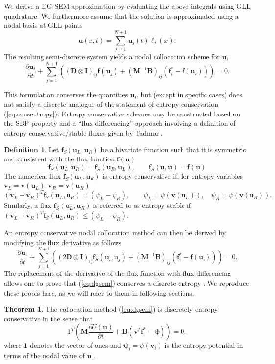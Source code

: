 \documentclass[preprint,10pt]{article}
\theoremstyle{definition}
\newtheorem{definition}{Definition}
\theoremstyle{lemma}
\theoremstyle{theorem}
\newtheorem{theorem}{Theorem}
\theoremstyle{assumption}
\newcommand{\pd}[2]{\frac{\partial#1}{\partial#2}}
\newcommand{\LRp}[1]{\left( #1 \right)}
\begin{document}
We derive a DG-SEM approximation by evaluating the above integrals using GLL quadrature.  We furthermore assume that the solution is approximated using a nodal basis at GLL points 
\[
\bm{u}(x,t) = \sum_{j=1}^{N+1} \bm{u}_j(t)\ell_j(x).  
\]
The resulting semi-discrete system yields a nodal collocation scheme for $\bm{u}_i$ 
\[
\pd{\bm{u}_i}{t} + \sum_{j=1}^{N+1}\LRp{\LRp{\bm{D}\otimes \bm{I}}_{ij}\bm{f}(\bm{u}_j) +\LRp{\bm{M}^{-1}\bm{B}}_{ij}(\bm{f}_i^* - \bm{f}(\bm{u}_i))} = 0.
\]

This formulation conserves the quantities $\bm{u}_i$, but (except in specific cases) does not satisfy a discrete analogue of the statement of entropy conservation (\ref{eq:consentropy}).  Entropy conservative schemes may be constructed based on the SBP property and a ``flux differencing'' approach \cite{gassner2016split} involving a definition of entropy conservative/stable fluxes given by Tadmor \cite{tadmor1987numerical, tadmor2003entropy}.  
\begin{definition}
Let $\bm{f}_S(\bm{u}_L,\bm{u}_R)$ be a bivariate function such that it is symmetric and consistent with the flux function $\bm{f}(\bm{u})$
\[
\bm{f}_S(\bm{u}_L,\bm{u}_R) = \bm{f}_S(\bm{u}_R,\bm{u}_L), \qquad \bm{f}_S(\bm{u},\bm{u}) = \bm{f}(\bm{u})
\]
The numerical flux $\bm{f}_S(\bm{u}_L, \bm{u}_R)$ is entropy conservative if, for entropy variables $\bm{v}_L = \bm{v}(\bm{u}_L), \bm{v}_R = \bm{v}(\bm{u}_R)$
\[
\LRp{\bm{v}_L - \bm{v}_R}^T \bm{f}_S(\bm{u}_L,\bm{u}_R) = (\psi_L - \psi_R), \qquad \psi_L = \psi(\bm{v}(\bm{u}_L)), \quad \psi_R = \psi(\bm{v}(\bm{u}_R)).  
\]
Similarly, a flux $\bm{f}_S(\bm{u}_L, \bm{u}_R)$ is referred to as entropy stable if $\LRp{\bm{v}_L - \bm{v}_R}^T \bm{f}_S(\bm{u}_L,\bm{u}_R) \leq (\psi_L - \psi_R)$.
\label{def:tadmor}
\end{definition}
An entropy conservative nodal collocation method can then be derived by modifying the flux derivative as follows
\begin{equation}
\pd{\bm{u}_i}{t} + \sum_{j=1}^{N+1}\LRp{\LRp{2\bm{D}\otimes \bm{I}}_{ij}\bm{f}_S(\bm{u}_i,\bm{u}_j) +\LRp{\bm{M}^{-1}\bm{B}}_{ij}(\bm{f}_i^* - \bm{f}(\bm{u}_i))}= 0.
\label{eq:dgsem}
\end{equation}
The replacement of the derivative of the flux function with flux differencing allows one to prove that (\ref{eq:dgsem}) conserves a discrete entropy \cite{gassner2017br1,chen2017entropy}.  We reproduce these proofs here, as we will refer to them in following sections.  
\begin{theorem}
The collocation method (\ref{eq:dgsem}) is discretely entropy conservative in the sense that
\[
\bm{1}^T\LRp{\bm{M}\pd{U(\bm{u})}{t} + \bm{B}\LRp{\bm{v}^T\bm{f}^* - \bm{\psi}}} = 0,
\]
where $\bm{1}$ denotes the vector of ones and $\bm{\psi}_i = \psi(\bm{v}_i)$ is the entropy potential in terms of the nodal value of $\bm{u}_i$.  
\label{thm:dgsem}
\end{theorem}
\end{document}
